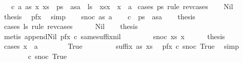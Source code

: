 \begin{isabellebody}
\ \ {\isacharbar}\ {\isacharparenleft}c{}{\isacharparenright}\ a\ as\ x\ xs\ \ {\isachardoublequoteopen}ps\ {\isacharequal}\ as{\isacharat}{\isacharbrackleft}a{\isacharbrackright}{\isachardoublequoteclose}\ \ {\isachardoublequoteopen}ls\ {\isacharequal}\ xs{\isacharat}{\isacharbrackleft}x{\isacharbrackright}{\isachardoublequoteclose}\ \ {\isachardoublequoteopen}x\ {\isasymnoteq}\ a{\isachardoublequoteclose}\isanewline
%
\isadelimproof
%
\endisadelimproof
%
\isatagproof
{}\isamarkupfalse%
\ {\isacharparenleft}cases\ ps\ rule{\isacharcolon}\ rev{\isacharunderscore}cases{\isacharparenright}\isanewline
\ \ \isamarkupfalse%
\ Nil\isanewline
\ \ \isamarkupfalse%
\ \isamarkupfalse%
\ {\isacharquery}thesis\ \isamarkupfalse%
\ pfx\ \isamarkupfalse%
\ simp\isanewline
{}\isamarkupfalse%
\isanewline
\ \ \isamarkupfalse%
\ {\isacharparenleft}snoc\ as\ a{\isacharparenright}\isanewline
\ \ \isamarkupfalse%
\ c\ {\isacharequal}\ {\isacartoucheopen}ps\ {\isacharequal}\ as{\isacharat}{\isacharbrackleft}a{\isacharbrackright}{\isacartoucheclose}\isanewline
\ \ \isamarkupfalse%
\ {\isacharquery}thesis\isanewline
\ \ \isamarkupfalse%
\ {\isacharparenleft}cases\ ls\ rule{\isacharcolon}\ rev{\isacharunderscore}cases{\isacharparenright}\isanewline
\ \ \ \ \isamarkupfalse%
\ Nil\ \isamarkupfalse%
\ \isamarkupfalse%
\ {\isacharquery}thesis\ \isamarkupfalse%
\ {\isacharparenleft}metis\ append{\isacharunderscore}Nil{}\ pfx\ c{}\ same{\isacharunderscore}suffix{\isacharunderscore}nil{\isacharparenright}\isanewline
\ \ \isamarkupfalse%
\isanewline
\ \ \ \ \isamarkupfalse%
\ {\isacharparenleft}snoc\ xs\ x{\isacharparenright}\isanewline
\ \ \ \ \isamarkupfalse%
\ {\isacharquery}thesis\isanewline
\ \ \ \ \isamarkupfalse%
\ {\isacharparenleft}cases\ {\isachardoublequoteopen}x\ {\isacharequal}\ a{\isachardoublequoteclose}{\isacharparenright}\isanewline
\ \ \ \ \ \ \isamarkupfalse%
\ True\isanewline
\ \ \ \ \ \ \isamarkupfalse%
\ {\isachardoublequoteopen}{\isasymnot}\ suffix\ as\ xs{\isachardoublequoteclose}\ \isamarkupfalse%
\ pfx\ c\ snoc\ True\ \isamarkupfalse%
\ simp\isanewline
\ \ \ \ \ \ \isamarkupfalse%
\ c\ snoc\ True\ \isamarkupfalse%

\end{isabellebody}
